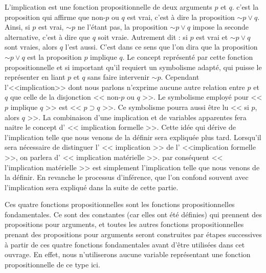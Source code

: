 \documentclass[a4paper]{book}
\begin{document}
L'implication est une fonction propositionnelle de deux arguments $p$ et $q$. c'est la proposition qui affirme que non-$p$ ou $q$ est vrai, c'est à dire la proposition $\sim p\lor q$. Ainsi, si $p$ est vrai, $\sim p$ ne l'étant pas, la proposition $\sim p\lor q$ impose la seconde alternative, c'est à dire que $q$ soit vraie. Autrement dit : si $p$ est vrai et $\sim p\lor q$ sont vraies, alors $q$ l'est aussi. C'est dans ce sens que l'on dira que la proposition $\sim p\lor q$ est la proposition $p$ implique $q$. Le concept représenté par cette fonction propositionnelle et si important  qu'il requiert un symbolisme adapté, qui puisse le représenter en liant $p$ et $q$ sans faire intervenir $\sim p$. Cependant l'<<implication>> dont nous parlons n'exprime aucune autre relation entre $p$ et $q$ que celle de la disjonction << non-$p$ ou $q$ >>. Le symbolisme employé pour << $p$ implique $q$ >> est << $p\supset q$ >>. Ce symbolisme pourra aussi être lu << si $p$, alors $q$ >>. La combinaison d'une implication et de variables apparentes fera naitre le concept d' << implication formelle >>. Cette idée qui dérive de l'implication telle que nous venons de la définir sera expliquée plus tard. Lorsqu'il sera nécessaire de distinguer l' << implication >> de l' <<implication formelle >>, on parlera d' << implication matérielle >>. par conséquent << l'implication matérielle >> est simplement l'implication telle que nous venons de la définir.
En revanche le processus d'inférence, que l'on confond souvent avec l'implication sera expliqué dans la suite de cette partie.

Ces quatre fonctions propositionnelles sont les fonctions propositionnelles fondamentales. Ce sont des constantes (car elles ont été définies) qui prennent des propositions pour arguments, et toutes les autres fonctions propositionnelles prenant des propositions pour arguments seront construites par étapes successives à partir de ces quatre fonctions fondamentales avant d'être utilisées dans cet ouvrage. En effet, nous n'utiliserons aucune variable représentant une fonction propositionnelle de ce type ici. 
\end{document}
